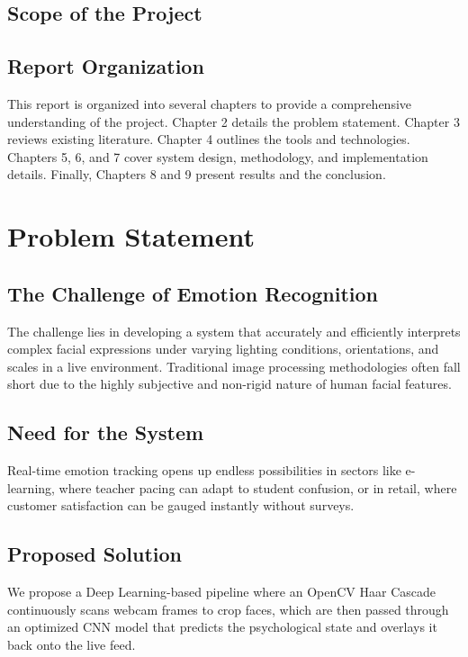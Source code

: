 \documentclass[12pt,a4paper]{report}
\begin{document}
\section{Scope of the Project}
\lipsum[4-6] %

\section{Report Organization}
This report is organized into several chapters to provide a comprehensive understanding of the project. Chapter 2 details the problem statement. Chapter 3 reviews existing literature. Chapter 4 outlines the tools and technologies. Chapters 5, 6, and 7 cover system design, methodology, and implementation details. Finally, Chapters 8 and 9 present results and the conclusion.


\chapter{Problem Statement}

\section{The Challenge of Emotion Recognition}
The challenge lies in developing a system that accurately and efficiently interprets complex facial expressions under varying lighting conditions, orientations, and scales in a live environment. Traditional image processing methodologies often fall short due to the highly subjective and non-rigid nature of human facial features.

\lipsum[7-10] %

\section{Need for the System}
Real-time emotion tracking opens up endless possibilities in sectors like e-learning, where teacher pacing can adapt to student confusion, or in retail, where customer satisfaction can be gauged instantly without surveys. 

\lipsum[11-14] %

\section{Proposed Solution}
We propose a Deep Learning-based pipeline where an OpenCV Haar Cascade continuously scans webcam frames to crop faces, which are then passed through an optimized CNN model that predicts the psychological state and overlays it back onto the live feed.
\end{document}
